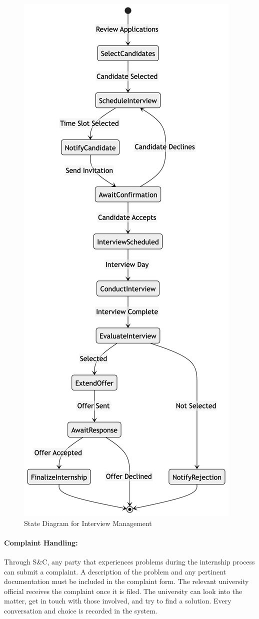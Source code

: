 \begin{figure}[H]
    \begin{center}
        \includegraphics[width=0.45\linewidth]{JhaBhatiaSharma/Images/State Diagrams/InterviewManagement.png}
        \caption{State Diagram for Interview Management}
        \label{fig:InterviewManagement}%
    \end{center}
\end{figure}

\paragraph{Complaint Handling:}
Through S\&C, any party that experiences problems during the internship process can submit a complaint. A description of the problem and any pertinent documentation must be included in the complaint form. The relevant university official receives the complaint once it is filed. The university can look into the matter, get in touch with those involved, and try to find a solution. Every conversation and choice is recorded in the system.

